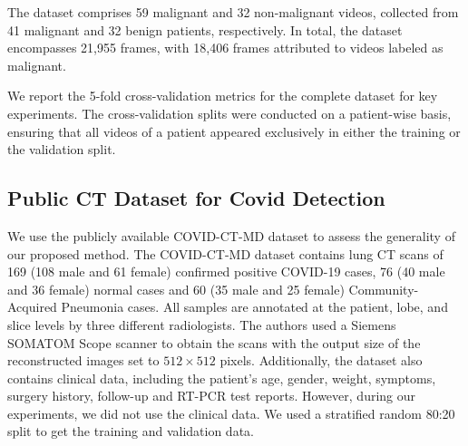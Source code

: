 %


%
The dataset comprises 59 malignant and 32 non-malignant videos, collected from 41 malignant and 32 benign patients, respectively. In total, the dataset encompasses 21,955 frames, with 18,406 frames attributed to videos labeled as malignant. %

%
We report the 5-fold cross-validation metrics for the complete dataset for key experiments. The cross-validation splits were conducted on a patient-wise basis, ensuring that all videos of a patient appeared exclusively in either the training or the validation split.

\subsection{Public CT Dataset for Covid Detection}
%
We use the publicly available COVID-CT-MD dataset \cite{covidctmd} to assess the generality of our proposed method. The COVID-CT-MD dataset contains lung CT scans of 169 (108 male and 61 female) confirmed positive COVID-19 cases, 76 (40 male and 36 female) normal cases and 60 (35 male and 25 female) Community-Acquired Pneumonia cases. All samples are annotated at the patient, lobe, and slice levels by three different radiologists. The authors used a Siemens SOMATOM Scope scanner to obtain the scans with the output size of the reconstructed images set to $512\times512$ pixels. 
Additionally, the dataset also contains clinical data, including the patient's age, gender, weight, symptoms, surgery history, follow-up and RT-PCR test reports. However, during our experiments, we did not use the clinical data. 
We used a stratified random 80:20 split to get the training and validation data.